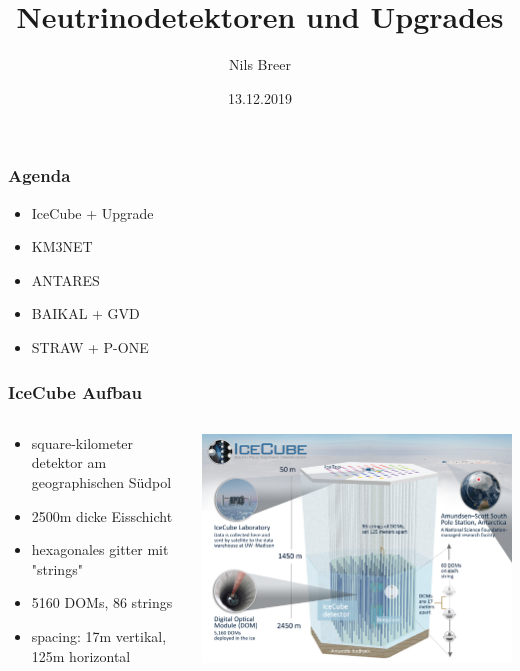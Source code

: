 \documentclass[aspectratio=1610, 9pt]{beamer}
\title{Neutrinodetektoren und Upgrades}
\author[N.Breer]{Nils Breer}
\institute{Fakultät Physik}
\date{13.12.2019}
\begin{document}
\maketitle

\begin{frame}\frametitle{Agenda}
  \begin{itemize}
    \item IceCube + Upgrade
    \item KM3NET
    \item ANTARES
    \item BAIKAL + GVD
    \item STRAW + P-ONE
  \end{itemize}
\end{frame}

\begin{frame}\frametitle{IceCube Aufbau}
  \begin{columns}
  \begin{column}[c]{0.45\textwidth}
    \begin{itemize}
      \item square-kilometer detektor am geographischen S\"udpol
      \item 2500m dicke Eisschicht
      \item hexagonales gitter mit "strings"
      \item 5160 DOMs, 86 strings
      \item spacing: 17m vertikal, 125m horizontal
    \end{itemize}
  \end{column}
  \begin{column}[c]{0.45\textwidth}
    \includegraphics{images/icecube.png}
  \end{column}
  \end{columns}
\end{frame}
\end{document}
